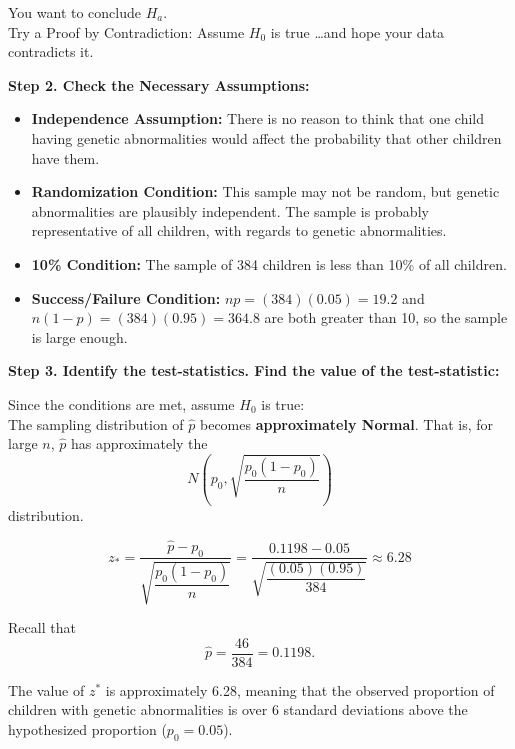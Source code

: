 \begin{example}
You want to conclude $H_a$. \\
Try a Proof by Contradiction: Assume $H_0$ is true \dots and hope your data contradicts it.

\vspace{1em}
\textbf{Step 2. Check the Necessary Assumptions:}

\begin{itemize}
  \item \textbf{Independence Assumption:} There is no reason to think that one child having genetic abnormalities would affect the probability that other children have them.

  \item \textbf{Randomization Condition:} This sample may not be random, but genetic abnormalities are plausibly independent. The sample is probably representative of all children, with regards to genetic abnormalities.

  \item \textbf{10\% Condition:} The sample of 384 children is less than 10\% of all children.

  \item \textbf{Success/Failure Condition:} $np = (384)(0.05) = 19.2$ and \\
  $n(1 - p) = (384)(0.95) = 364.8$ are both greater than 10, so the sample is large enough.
\end{itemize}
\vspace{1em}
\textbf{Step 3. Identify the test-statistics. Find the value of the test-statistic:}

Since the conditions are met, assume $H_0$ is true: \\
The sampling distribution of $\hat{p}$ becomes \textbf{approximately Normal}. That is, for large $n$, $\hat{p}$ has approximately the
\[
N\left(p_0, \sqrt{\frac{p_0(1 - p_0)}{n}}\right)
\]
distribution.

\[
z_\ast = \frac{\hat{p} - p_0}{\sqrt{\dfrac{p_0(1 - p_0)}{n}}}
= \frac{0.1198 - 0.05}{\sqrt{\dfrac{(0.05)(0.95)}{384}}}
\approx 6.28
\]

Recall that
\[
\hat{p} = \frac{46}{384} = 0.1198.
\]

The value of $z^\ast$ is approximately 6.28, meaning that the observed proportion of children with genetic abnormalities is over 6 standard deviations above the hypothesized proportion ($p_0 = 0.05$).
\end{example}










